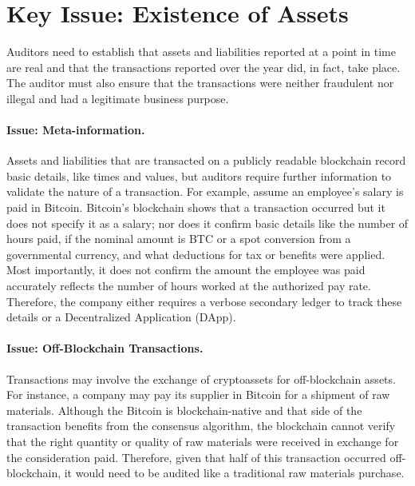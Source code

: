 \section{Key Issue: Existence of Assets}

Auditors need to establish that assets and liabilities reported at a point in time are real and that the transactions reported over the year did, in fact, take place. The auditor must also ensure that the transactions were neither fraudulent nor illegal and had a legitimate business purpose.  

\paragraph{Issue: Meta-information.} Assets and liabilities that are transacted on a publicly readable blockchain record basic details, like times and values, but auditors require further information to validate the nature of a transaction. For example, assume an employee{'}s salary is paid in Bitcoin. Bitcoin{'}s blockchain shows that a transaction occurred but it does not specify it as a salary; nor does it confirm basic details like the number of hours paid, if the nominal amount is BTC or a spot conversion from a governmental currency, and what deductions for tax or benefits were applied. Most importantly, it does not confirm the amount the employee was paid accurately reflects the number of hours worked at the authorized pay rate. Therefore, the company either requires a verbose secondary ledger to track these details or a Decentralized Application (DApp).

\paragraph{Issue: Off-Blockchain Transactions.} Transactions may involve the exchange of cryptoassets for off-blockchain assets. For instance, a company may pay its supplier in Bitcoin for a shipment of raw materials. Although the Bitcoin is blockchain-native and that side of the transaction benefits from the consensus algorithm, the blockchain cannot verify that the right quantity or quality of raw materials were received in exchange for the consideration paid. Therefore, given that half of this transaction occurred off-blockchain, it would need to be audited like a traditional raw materials purchase. 

